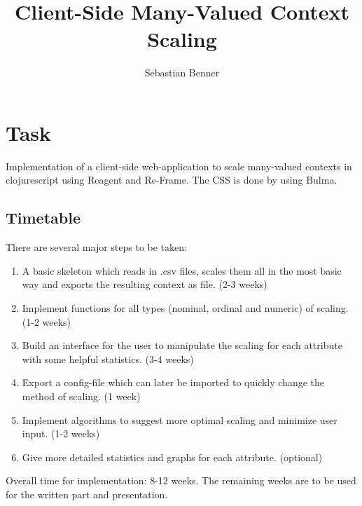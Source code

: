 \documentclass[]{article}
\title{Client-Side Many-Valued Context Scaling}
\author{Sebastian Benner}
\begin{document}
\maketitle

\section{Task}
Implementation of a client-side web-application to scale many-valued contexts in clojurescript using Reagent and Re-Frame. The CSS is done by using Bulma.

\subsection{Timetable}
There are several major steps to be taken:
\begin{enumerate}
	\item A basic skeleton which reads in .csv files, scales them all in the most basic way and exports the resulting context as file. (2-3 weeks)
	\item Implement functions for all types (nominal, ordinal and numeric) of scaling. (1-2 weeks)
	\item Build an interface for the user to manipulate the scaling for each attribute with some helpful statistics. (3-4 weeks)
	\item Export a config-file which can later be imported to quickly change the method of scaling. (1 week)
	\item Implement algorithms to suggest more optimal scaling and minimize user input. (1-2 weeks)
	\item Give more detailed statistics and graphs for each attribute. (optional)
\end{enumerate}
Overall time for implementation: 8-12 weeks. The remaining weeks are to be used for the written part and presentation.
\end{document}
